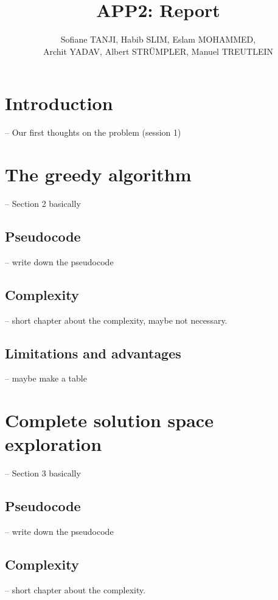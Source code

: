 \documentclass[parskip=full]{scrartcl}
\title{APP2: Report}
\author{Sofiane TANJI, Habib SLIM, Eslam MOHAMMED,\\ Archit YADAV, Albert STRÜMPLER, Manuel TREUTLEIN}
\begin{document}
\maketitle

\section{Introduction}
-- Our first thoughts on the problem (session 1)

\section{The greedy algorithm}
-- Section 2 basically

\subsection{Pseudocode}
-- write down the pseudocode

\subsection{Complexity}
-- short chapter about the complexity, maybe not necessary.

\subsection{Limitations and advantages}
-- maybe make a table


\section{Complete solution space exploration}
-- Section 3 basically

\subsection{Pseudocode}
-- write down the pseudocode

\subsection{Complexity}
-- short chapter about the complexity.

\printnoidxglossaries
\end{document}
